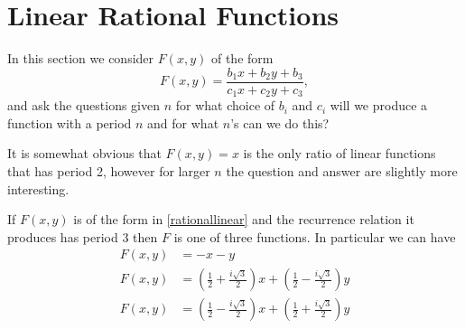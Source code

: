 \documentclass[12pt]{article}
\begin{document}
\section{Linear Rational Functions}
In this section we consider $F(x,y)$ of the form
\begin{equation}
\label{rationallinear}
F(x,y) = \frac{b_1 x+b_2 y + b_3}{c_1 x + c_2 y+ c_3},
\end{equation}
and ask the questions given $n$ for what choice of $b_i$ and $c_i$ will we produce a function with a period $n$ and for what $n$'s can we do this?

It is somewhat obvious that $F(x,y)=x$ is the only ratio of linear functions that has period 2, however for larger $n$ the question and answer are slightly more interesting. 
\begin{proposition} 
If $F(x,y)$ is of the form in \ref{rationallinear} and the recurrence relation it produces has period $3$ then $F$ is one of three functions. In particular we can have 
\begin{align*}
F(x,y) &= -x-y \\
F(x,y) &= \left( \frac{1}{2} +\frac{i\sqrt{3}}{2} \right) x + \left( \frac{1}{2} -\frac{i\sqrt{3}}{2} \right) y \\
F(x,y) &= \left( \frac{1}{2} -\frac{i\sqrt{3}}{2} \right) x + \left( \frac{1}{2} +\frac{i\sqrt{3}}{2} \right) y
\end{align*}
\end{proposition}
\end{document}
